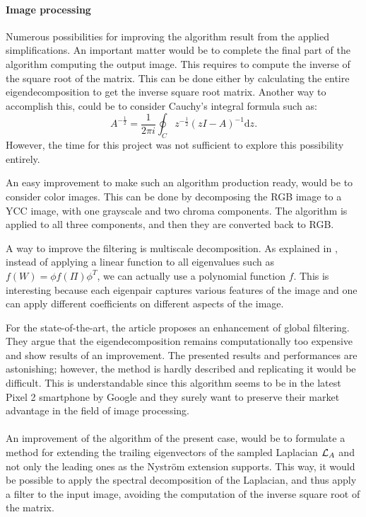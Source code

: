 \paragraph{Image processing}
Numerous possibilities for improving the algorithm result from the applied simplifications.
An important matter would be to complete the final part of the algorithm computing the output image.
This requires to compute the inverse of the square root of the matrix.
\ifthesis
 This can be done either by calculating the entire eigendecomposition to get the inverse square root matrix.
 Another way to accomplish this, could be to consider Cauchy's integral formula such as:
 \[A^{-\frac{1}{2}} = \frac{1}{2\pi i} \oint_C z^{-\frac{1}{2}} (zI - A)^{-1} \mathrm{d}z.\]
 However, the time for this project was not sufficient to explore this possibility entirely.
\fi

\ifthesis
 An easy improvement to make such an algorithm production ready, would be to consider color images.
 This can be done by decomposing the RGB image to a YCC image, with one grayscale and two chroma components.
 The algorithm is applied to all three components, and then they are converted back to RGB.
\fi

A way to improve the filtering is multiscale decomposition.
As explained in \cite{talebi_nonlocal_2014}, instead of applying a linear function to all eigenvalues such as \(f(W) = \phi f(\Pi) \phi^T\), we can actually use a polynomial function \(f\).
This is interesting because each eigenpair captures various features of the image and one can apply different coefficients on different aspects of the image.

For the state-of-the-art, the article \cite{talebi_fast_2016} proposes an enhancement of global filtering.
They argue that the eigendecomposition remains computationally too expensive and show results of an improvement.
The presented results and performances are astonishing; however, the method is hardly described and replicating it would be difficult.
This is understandable since this algorithm seems to be in the latest Pixel 2 smartphone by Google and they surely want to preserve their market advantage in the field of image processing.

\paragraph{}
An improvement of the algorithm of the present case, would be to formulate a method for extending the trailing eigenvectors of the sampled Laplacian \(\operatorname{\mathcal{L}}_A\) and not only the leading ones as the Nystr\"om extension supports.
This way, it would be possible to apply the spectral decomposition of the Laplacian, and thus apply a filter to the input image, avoiding the computation of the inverse square root of the matrix.

